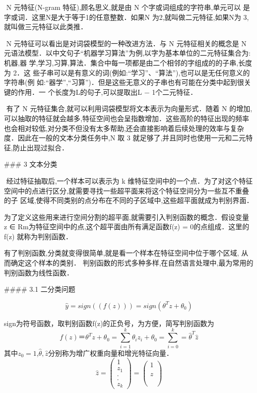 ​	N 元特征(N-gram 特征),顾名思义,就是由 N 个字或词组成的字符串,单元可以 是字或词．这里N是大于等于1的任意整数．如果N 为2,就叫做二元特征,如果N为 3,就叫做三元特征以此类推．

​	N 元特征可以看出是对词袋模型的一种改进方法．与 N 元特征相关的概念是 N 元语法模型．以中文句子“机器学习算法”为例,以字为基本单位的二元特征集合为:{机器,器 学,学习,习算,算法}．集合中每一项都是由二个相邻的字组成的的子串,长度为 2．这 些子串可以是有意义的词(例如:“学习”、“算法”),也可以是无任何意义的字符串(例 如:“器学”,“习算”)．但是这些无意义的子串也有可能在分类中起到很关键的作用．一 个长度为L的句子,可以提取出L − 1个二元特征．

​	有了 N 元特征集合,就可以利用词袋模型将文本表示为向量形式．随着 N 的增加, 可以抽取的特征就会越多,特征空间也会呈指数增加．这些高阶的特征出现的频率也会相对较低,对分类不但没有太多帮助,还会直接影响着后续处理的效率与复杂度．因此在一般的文本分类任务中,N 取 3 就足够了,并且同时也使用一元和二元特征,防止出现过拟合．

### 3 文本分类

​	经过特征抽取后,一个样本可以表示为 k 维特征空间中的一个点．为了对这个特征 空间中的点进行区分,就需要寻找一些超平面来将这个特征空间分为一些互不重叠的子 区域,使得不同类别的点分布在不同的子区域中,这些超平面就成为判别界面．

​	为了定义这些用来进行空间分割的超平面,就需要引入判别函数的概念．假设变量 z ∈ Rm为特征空间中的点,这个超平面由所有满足函数f(z) = 0的点组成．这里的f(z) 就称为判别函数．

​	有了判别函数,分类就变得很简单,就是看一个样本在特征空间中位于哪个区域, 从而确定这个样本的类别．  判别函数的形式多种多样,在自然语言处理中,最为常用的判别函数为线性函数．

#### 3.1 二分类问题

$$
\hat y =sign((f(z))) = sign(\theta^Tz+\theta_0)
$$

sign为符号函数，取判别函数f(z)的正负号，为方便，简写判别函数为
$$
f(z) ＝ \theta^Tz+\theta_0 = \sum_{i=1}^{k}\theta_iz_i + \theta_0 = \sum_{i=0}^{k} = \hat \theta^T \hat z
$$
其中$z_0=1$,$\hat\theta,\hat z$分别称为增广权重向量和增光特征向量．
$$
\hat z = \left( 
		\begin{array} {ccc} 1 \\  z_1\\ .\\ .\\  z_k
		\end{array}
        	\right) =  \left( 
        	\begin{array}{ccc}
		1 \\ \\ z \\ \\  \\  
		\end{array}
        	\right)
$$

